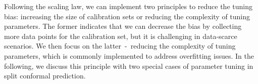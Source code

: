 \documentclass{article}
\newcommand{\1}{\mathbbm{1}}
\theoremstyle{plain}
\theoremstyle{definition}
\theoremstyle{remark}
\begin{document}
Following the scaling law, we can implement two principles to reduce the tuning bias: increasing the size of calibration sets or reducing the complexity of tuning parameters. The former indicates that we can decrease the bias by collecting more data points for the calibration set, but it is challenging in data-scarce scenarios. We then focus on the latter~-~reducing the complexity of tuning parameters, which is commonly implemented to address overfitting issues. In the following, we discuss this principle with two special cases of parameter tuning in split conformal prediction.


\begin{table}[ht!]
    \centering
    \caption{\textbf{Tuning bias comparison of various methods.} The calibration set size is 2500 for CIFAR-100 and 5000 for ImageNet using APS\@. Results in \textbf{bold} indicate superior performance.}
    \label{tab:performance} %
    \renewcommand\arraystretch{1.2}
\end{table}
\end{document}
